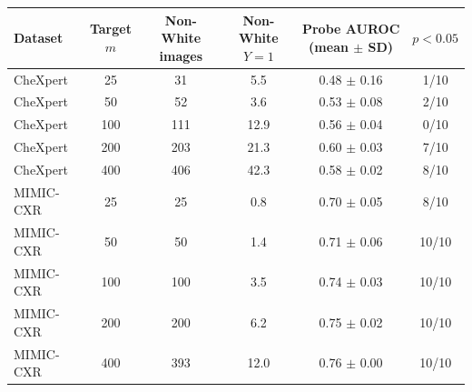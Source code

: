 \begin{tabular}{lccccc}
\toprule
Dataset & Target $m$ & Non-White images & Non-White $Y{=}1$ & Probe AUROC (mean $\pm$ SD) & $p<0.05$ \\
\midrule
CheXpert & 25 & 31 & 5.5 & 0.48 $\pm$ 0.16 & 1/10 \\
CheXpert & 50 & 52 & 3.6 & 0.53 $\pm$ 0.08 & 2/10 \\
CheXpert & 100 & 111 & 12.9 & 0.56 $\pm$ 0.04 & 0/10 \\
CheXpert & 200 & 203 & 21.3 & 0.60 $\pm$ 0.03 & 7/10 \\
CheXpert & 400 & 406 & 42.3 & 0.58 $\pm$ 0.02 & 8/10 \\
\midrule
MIMIC-CXR & 25 & 25 & 0.8 & 0.70 $\pm$ 0.05 & 8/10 \\
MIMIC-CXR & 50 & 50 & 1.4 & 0.71 $\pm$ 0.06 & 10/10 \\
MIMIC-CXR & 100 & 100 & 3.5 & 0.74 $\pm$ 0.03 & 10/10 \\
MIMIC-CXR & 200 & 200 & 6.2 & 0.75 $\pm$ 0.02 & 10/10 \\
MIMIC-CXR & 400 & 393 & 12.0 & 0.76 $\pm$ 0.00 & 10/10 \\
\bottomrule
\end{tabular}

